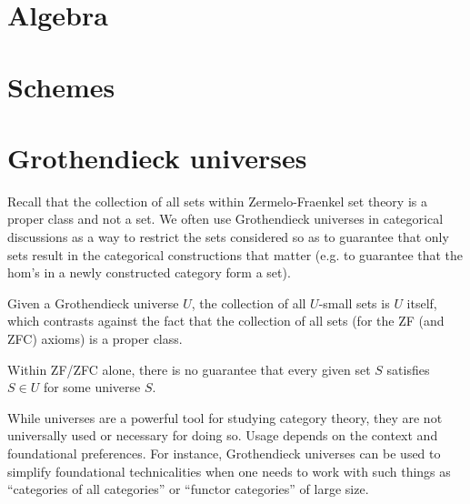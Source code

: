 \section{Algebra}













\section{Schemes}


\section{Grothendieck universes}

Recall that the collection of all sets within Zermelo-Fraenkel set theory is a proper class and not a set. We often use Grothendieck universes in categorical discussions as a way to restrict the sets considered so as to guarantee that only sets result in the categorical constructions that matter (e.g. to guarantee that the hom's in a newly constructed category form a set).


\begin{remark}
    Given a Grothendieck universe $U$, the collection of all $U$-small sets is $U$ itself, which contrasts against the fact that the collection of all sets (for the ZF (and ZFC) axioms) is a proper class.
\end{remark}

\begin{remark}
    Within ZF/ZFC alone, there is no guarantee that every given set $S$ satisfies $S \in U$ for some universe $S$.
\end{remark}

\begin{remark}
    While universes are a powerful tool for studying category theory, they are not universally used or necessary for doing so. Usage depends on the context and foundational preferences. For instance, Grothendieck universes can be used to simplify foundational technicalities when one needs to work with such things as ``categories of all categories'' or ``functor categories'' of large size. 
\end{remark}




